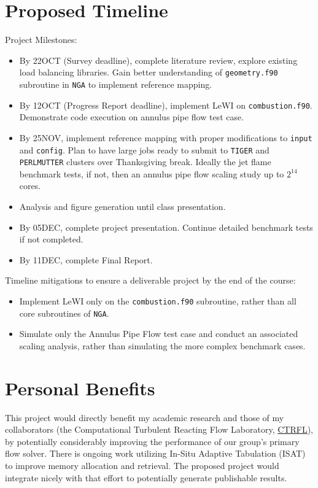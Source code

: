 \documentclass{homework}
\begin{document}
\section{\textbf{Proposed Timeline}}
\noindent Project Milestones:
\begin{itemize} \small
\item By 22OCT (Survey deadline), complete literature review, explore existing load balancing libraries. Gain better understanding of \texttt{geometry.f90} subroutine in \texttt{NGA} to implement reference mapping.
\item By 12OCT (Progress Report deadline), implement LeWI on \texttt{combustion.f90}. Demonstrate code execution on annulus pipe flow test case.
\item By 25NOV, implement reference mapping with proper modifications to \texttt{input} and \texttt{config}. Plan to have large jobs ready to submit to \texttt{TIGER} and \texttt{PERLMUTTER} clusters over Thanksgiving break. Ideally the jet flame benchmark tests, if not, then an annulus pipe flow scaling study up to $2^{14}$ cores.
\item Analysis and figure generation until class presentation.
\item By 05DEC, complete project presentation. Continue detailed benchmark tests if not completed.
\item By 11DEC, complete Final Report.
\end{itemize} \normalsize

\noindent Timeline mitigations to ensure a deliverable project by the end of the course:
\begin{itemize} \small
\item Implement LeWI only on the \texttt{combustion.f90} subroutine, rather than all core subroutines of \texttt{NGA}.
\item Simulate only the Annulus Pipe Flow test case and conduct an associated scaling analysis, rather than simulating the more complex benchmark cases.
\end{itemize}\normalsize

\section{\textbf{Personal Benefits}}
\noindent This project would directly benefit my academic research and those of my collaborators (the Computational Turbulent Reacting Flow Laboratory, \href{https://ctrfl.princeton.edu/}{CTRFL}), by potentially considerably improving the performance of our group's primary flow solver.  There is ongoing work utilizing In-Situ Adaptive Tabulation (ISAT) \cite{LACEY2021} to improve memory allocation and retrieval. The proposed project would integrate nicely with that effort to potentially generate publishable results.
\end{document}
